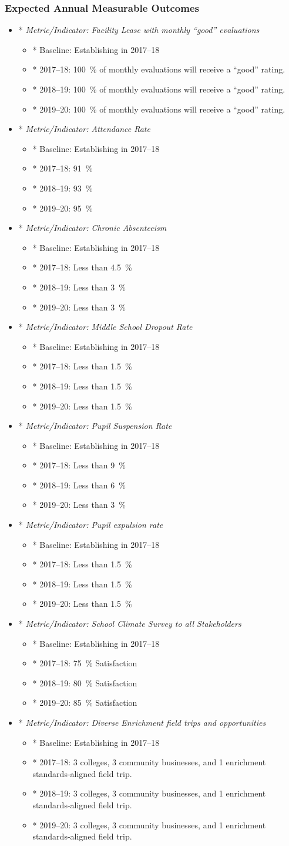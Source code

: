 \documentclass{article}
\newcounter{goal}[section] %
\newcommand{\expoutcome}[5]{
	\item*
	{\em Metric/Indicator: #1}
	\begin{itemize}
		\item* Baseline: #2
		\item* 2017--18: #3
		\item* 2018--19: #4
		\item* 2019--20: #5
	\end{itemize}
}
\newenvironment{expoutcomes}
	{
		\subsubsection{Expected Annual Measurable Outcomes}
		\begin{itemize}
	}
	{\end{itemize}}
\newcounter{action}[goal]
\begin{document}
\begin{expoutcomes}
	\expoutcome
	{Facility Lease with monthly ``good'' evaluations}
	{Establishing in 2017--18}
	{\SI{100}{\percent} of monthly evaluations will receive a ``good'' rating.}
	{\SI{100}{\percent} of monthly evaluations will receive a ``good'' rating.}
	{\SI{100}{\percent} of monthly evaluations will receive a ``good'' rating.}
	\expoutcome
	{Attendance Rate}
	{Establishing in 2017--18}
	{\SI{91}{\percent}}
	{\SI{93}{\percent}}
	{\SI{95}{\percent}}
	\expoutcome
	{Chronic Absenteeism}
	{Establishing in 2017--18}
	{Less than \SI{4.5}{\percent}}
	{Less than \SI{3}{\percent}}
	{Less than \SI{3}{\percent}}
	\expoutcome
	{Middle School Dropout Rate}
	{Establishing in 2017--18}
	{Less than \SI{1.5}{\percent}}
	{Less than \SI{1.5}{\percent}}
	{Less than \SI{1.5}{\percent}}
	\expoutcome
	{Pupil Suspension Rate}
	{Establishing in 2017--18}
	{Less than \SI{9}{\percent}}
	{Less than \SI{6}{\percent}}
	{Less than \SI{3}{\percent}}
	\expoutcome
	{Pupil expulsion rate}
	{Establishing in 2017--18}
	{Less than \SI{1.5}{\percent}}
	{Less than \SI{1.5}{\percent}}
	{Less than \SI{1.5}{\percent}}
	\expoutcome
	{School Climate Survey to all Stakeholders}
	{Establishing in 2017--18}
	{\SI{75}{\percent} Satisfaction}
	{\SI{80}{\percent} Satisfaction}
	{\SI{85}{\percent} Satisfaction}
	\expoutcome
	{Diverse Enrichment field trips and opportunities}
	{Establishing in 2017--18}
	{3 colleges, 3 community businesses, and 1 enrichment standards-aligned field trip.}
	{3 colleges, 3 community businesses, and 1 enrichment standards-aligned field trip.}
	{3 colleges, 3 community businesses, and 1 enrichment standards-aligned field trip.}
\end{expoutcomes}
\end{document}
